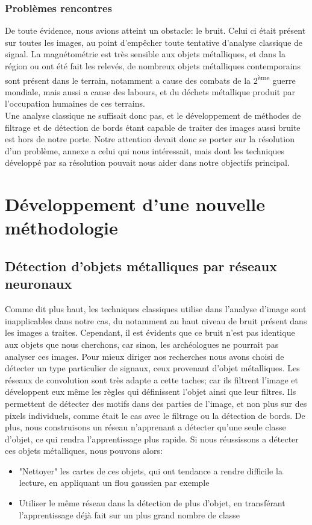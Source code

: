 \documentclass[a4paper, 12pt, titlepage, oneside, french]{article}
\begin{document}
	\subsubsection{Problèmes rencontres}
	De toute évidence, nous avions atteint un obstacle: le bruit. Celui ci était présent sur toutes les images, au point d'empêcher toute tentative d'analyse classique de signal. La magnétométrie est très sensible aux objets métalliques, et dans la région ou ont été fait les relevés, de nombreux objets métalliques contemporains sont présent dans le terrain, notamment a cause des combats de la 2\textsuperscript{ème} guerre mondiale, mais aussi a cause des labours, et du déchets métallique produit par l'occupation humaines de ces terrains.\\
	Une analyse classique ne suffisait donc pas, et le développement de méthodes de filtrage et de détection de bords étant capable de traiter des images aussi bruite est hors de notre porte. Notre attention devait donc se porter sur la résolution d'un problème, annexe a celui qui nous intéressait, mais dont les techniques développé par sa résolution pouvait nous aider dans notre objectifs principal.

\newpage
\section{Développement d'une nouvelle méthodologie}
	\subsection{Détection d'objets métalliques par réseaux neuronaux}
	Comme dit plus haut, les techniques classiques utilise dans l'analyse d'image sont inapplicables dans notre cas, du notamment au haut niveau de bruit présent dans les images a traites. Cependant, il est évidents que ce bruit n'est pas identique aux objets que nous cherchons, car sinon, les archéologues ne pourrait pas analyser ces images. Pour mieux diriger nos recherches nous avons choisi de détecter un type particulier de signaux, ceux provenant d'objet métalliques. Les réseaux de convolution sont très adapte a cette taches; car ils filtrent l'image et développent eux même les règles qui définissent l'objet ainsi que leur filtres. Ils permettent de détecter des motifs dans des parties de l'image, et non plus sur des pixels individuels, comme était le cas avec le filtrage ou la détection de bords. De plus, nous construisons un réseau n'apprenant a détecter qu'une seule classe d'objet, ce qui rendra l'apprentissage plus rapide. Si nous réussissons a détecter ces objets métalliques, nous pouvons alors:
	\begin{itemize}
		\item "Nettoyer" les cartes de ces objets, qui ont tendance a rendre difficile la lecture, en appliquant un flou gaussien par exemple
		\item Utiliser le même réseau dans la détection de plus d'objet, en transférant l'apprentissage déjà fait sur un plus grand nombre de classe
	\end{itemize}
\end{document}
